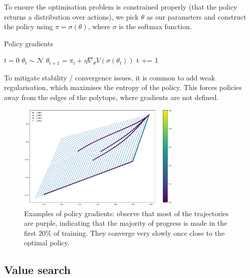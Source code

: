 To ensure the optimisation problem is constrained properly (that the policy returns a distribution over actions),
we pick $\theta$ as our parameters and construct the policy using $\pi = \sigma(\theta)$, where $\sigma$ is the softmax function.

\begin{algorithm}[H]
\caption{Policy gradients}
\begin{algorithmic}[1]

  \State $t=0$
  \State $\theta_t \sim \mathcal N$ 
    \State $\theta_{t+1} = \pi_t + \eta \nabla_{\theta} V(\sigma(\theta_t))$ 
    \State t += 1
  \EndWhile
  \State {}
\EndProcedure

\end{algorithmic}
\end{algorithm}

To mitigate stability / convergence issues, it is common to add weak regularisation,
which maximises the entropy of the policy. This forces policies away
from the edges of the polytope, where gradients are not defined.

\begin{figure}[h!]
\centering
\includegraphics[width=0.7\textwidth,height=0.35\textheight]{../../pictures/figures/pg-polytope.png}
\caption{
Examples of policy gradients: observe that most of the trajectories are purple,
indicating that the majority of progress is made in the first 20\% of training.
They converge very slowly once close to the optimal policy.}
\end{figure}


\newpage
\subsection{Value search}

